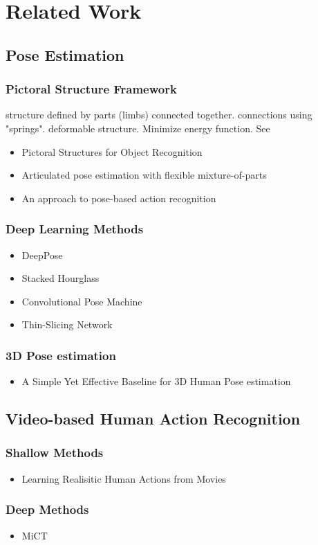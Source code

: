 \chapter{Related Work}

\section{Pose Estimation}
\subsection{Pictoral Structure Framework}
structure defined by parts (limbs) connected together. connections using "springs". deformable structure.
Minimize energy function. See \cite{zhu_articulated_2016}

\begin{itemize}
    \item Pictoral Structures for Object Recognition \cite{felzenszwalb_pictorial_2005}
    \item Articulated pose estimation with flexible mixture-of-parts \cite{yang_articulated_2011}
    \item An approach to pose-based action recognition \cite{wang_approach_2013}
\end{itemize}

\subsection{Deep Learning Methods}
\begin{itemize}
    \item DeepPose \cite{toshev_deeppose:_2014}
    \item Stacked Hourglass \cite{newell_stacked_2016}
    \item Convolutional Pose Machine \cite{wei_convolutional_2016}
    \item Thin-Slicing Network \cite{song_thin-slicing_2017}
\end{itemize}

\subsection{3D Pose estimation}
\begin{itemize}
    \item A Simple Yet Effective Baseline for 3D Human Pose estimation \cite{martinez_simple_2017}
\end{itemize}

\section{Video-based Human Action Recognition}
\subsection{Shallow Methods}
\begin{itemize}
    \item Learning Realisitic Human Actions from Movies \cite{laptev_learning_2008}
\end{itemize}

\subsection{Deep Methods}
\begin{itemize}
    \item MiCT \cite{zhou_mict:_2018}
\end{itemize}